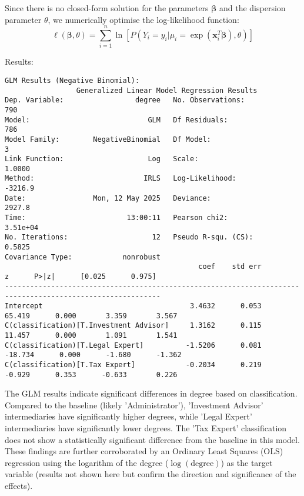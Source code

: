 Since there is no closed-form solution for the parameters $\boldsymbol{\beta}$ and the dispersion parameter $\theta$, we numerically optimise the log-likelihood function:
\[
    \ell(\boldsymbol{\beta}, \theta) = \sum_{i=1}^n \ln \left[ P(Y_i=y_i | \mu_i = \exp(\mathbf{x}_i^T \boldsymbol{\beta}), \theta) \right]
\]

Results:
\begin{verbatim}
GLM Results (Negative Binomial):
                 Generalized Linear Model Regression Results                  
Dep. Variable:                 degree   No. Observations:                  790
Model:                            GLM   Df Residuals:                      786
Model Family:        NegativeBinomial   Df Model:                            3
Link Function:                    Log   Scale:                          1.0000
Method:                          IRLS   Log-Likelihood:                -3216.9
Date:                Mon, 12 May 2025   Deviance:                       2927.8
Time:                        13:00:11   Pearson chi2:                 3.51e+04
No. Iterations:                    12   Pseudo R-squ. (CS):             0.5825
Covariance Type:            nonrobust                                         
                                              coef    std err          z      P>|z|      [0.025      0.975]
-----------------------------------------------------------------------------------------------------------
Intercept                                   3.4632      0.053     65.419      0.000       3.359       3.567
C(classification)[T.Investment Advisor]     1.3162      0.115     11.457      0.000       1.091       1.541
C(classification)[T.Legal Expert]          -1.5206      0.081    -18.734      0.000      -1.680      -1.362
C(classification)[T.Tax Expert]            -0.2034      0.219     -0.929      0.353      -0.633       0.226
\end{verbatim}

The GLM results indicate significant differences in degree based on classification. Compared to the baseline (likely 'Administrator'), 'Investment Advisor' intermediaries have significantly higher degrees, while 'Legal Expert' intermediaries have significantly lower degrees. The 'Tax Expert' classification does not show a statistically significant difference from the baseline in this model. These findings are further corroborated by an Ordinary Least Squares (OLS) regression using the logarithm of the degree ($\log(\text{degree})$) as the target variable (results not shown here but confirm the direction and significance of the effects).


